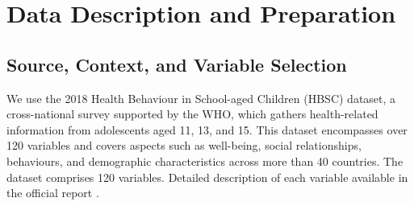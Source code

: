 \documentclass[main.tex]{subfiles}
\begin{document}
\section{Data Description and Preparation}

\subsection{Source, Context, and Variable Selection}
We use the 2018 Health Behaviour in School-aged Children (HBSC) dataset, a cross-national survey supported by the WHO, which gathers health-related information from adolescents aged 11, 13, and 15. This dataset encompasses over 120 variables and covers aspects such as well-being, social relationships, behaviours, and demographic characteristics across more than 40 countries. The dataset comprises 120 variables. Detailed description of each variable available in the official report \cite{HBSC2018OA_ed1}. 
\end{document}

